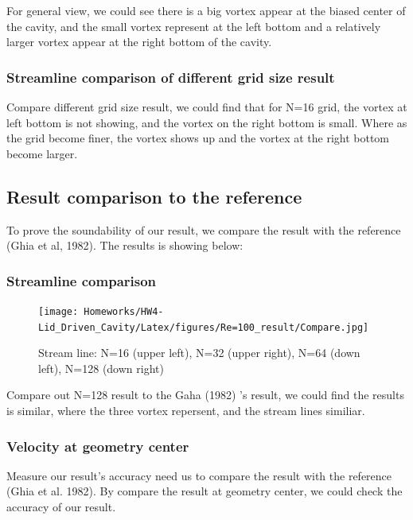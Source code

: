 \documentclass[12pt]{article}
\begin{document}
For general view, we could see there is a big vortex appear at the biased center of the cavity, 
and the small vortex represent at 
the left bottom and a relatively larger vortex appear at the  right bottom of the cavity.\\


\subsubsection{Streamline comparison of different grid size result}
Compare different grid size result, 
we could find that for N=16 grid, 
the vortex at left bottom is not showing,
 and the vortex on the right bottom is small. 
 Where as the grid become finer, 
 the vortex shows up and the vortex at 
 the right bottom become larger.







\subsection{Result comparison to the reference}

To prove the soundability of our result, we compare the result with the reference (Ghia et al, 1982). The results is showing below:

\subsubsection{Streamline comparison}
\begin{figure}[H]
    \centering
    \texttt{[image: Homeworks/HW4-Lid\_Driven\_Cavity/Latex/figures/Re=100\_result/Compare.jpg]}
    \caption{Stream line: N=16 (upper left), N=32 (upper right), 
    N=64 (down left), N=128 (down right)}
\end{figure}

Compare out N=128 result to the Gaha (1982) 's result, we could find the results is similar, where the three vortex repersent, and the stream lines similiar.

\subsubsection{Velocity at geometry center}


Measure our result's accuracy need us to compare the result with the reference (Ghia et al. 1982). By compare the result at geometry center, we could check the accuracy of our result. 
\end{document}
